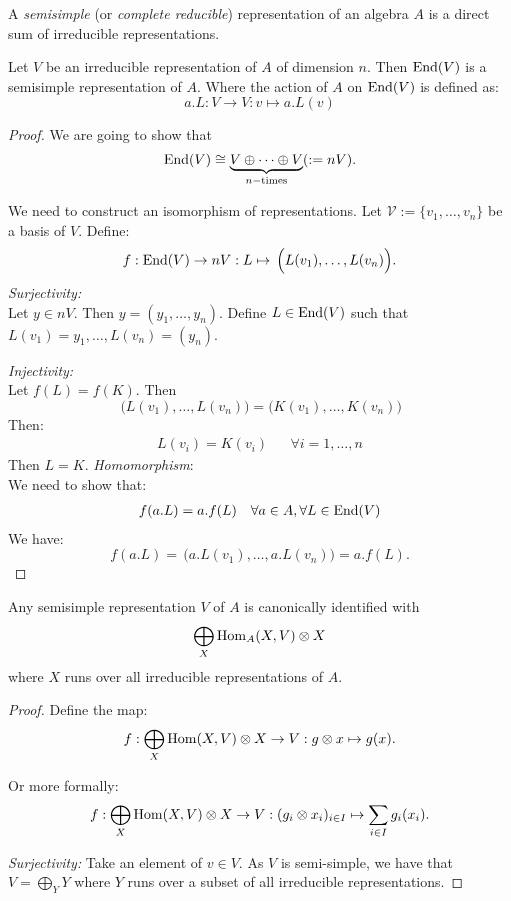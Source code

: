 \begin{defn}

A \emph{semisimple} (or \emph{complete reducible}) representation of an algebra \(A\) is a direct sum of irreducible representations.

\end{defn}

\begin{prop}

Let \(V\) be an irreducible representation of \(A\) of dimension \(n\). Then \(\operatorname{End} (V)\) is a semisimple representation of \(A\). Where the action of \(A\) on $\operatorname{End}(V)$ is defined as:
\[a.L:V\rightarrow V:v\mapsto a.L(v)\]

\end{prop}

\begin{proof}
We are going to show that
\[\operatorname{End}(V) \cong  \underbrace{V \oplus  \cdots \oplus V}_{n-\text{times}}(:=nV).\]

We need to construct an isomorphism of representations. Let \(\mathcal{V}:=\{v_{1},\ldots ,v_{n}\}\) be a basis of \(V\). Define:
\[f:\operatorname{End}(V) \rightarrow nV : L  \mapsto \, \Big(L(v_{1}),\ldots ,L(v_{n})\Big).\]
\emph{Surjectivity:} \\Let \(y\in nV\). Then \(y=(y_{1},\ldots ,y_{n})\). Define \(L\in \operatorname{End}(V)\) such that \(L(v_{1})=y_{1},\ldots ,L(v_{n})=(y_{n})\).

\emph{Injectivity:} \\Let \(f(L)=f(K)\). Then
\[\, \Big(L(v_{1}),\ldots ,L(v_{n})\Big)=\Big(K(v_{1}),\ldots ,K(v_{n})\Big)\]
Then:
\begin{align*}L(v_{i})=K(v_{i}) && \forall i=1,\ldots ,n\end{align*}
Then \(L=K\).
\newpage
\emph{Homomorphism}: \\We need to show that:
\begin{align*}f(a.L)=a.f(L) && \forall a\in A,\forall L\in \operatorname{End}(V)\end{align*}
We have:
\[f(a.L)=\, \Big(a.L(v_{1}),\ldots ,a.L(v_{n})\Big)=a.f(L).\]
\end{proof}


\begin{prop}

Any semisimple representation \(V\) of \(A\) is canonically identified with
\[\bigoplus_{X} \operatorname{Hom}_{A} (X,V) \otimes  X\]
where \(X\) runs over all irreducible representations of \(A\).
\end{prop}

\begin{proof}

Define the map:
\[f:\bigoplus_{X} \operatorname{Hom}(X,V) \otimes X \rightarrow V : g\otimes x \mapsto  g(x).\]

Or more formally:
\[f:\bigoplus_{X} \operatorname{Hom}(X,V) \otimes X \rightarrow V : (g_{i}\otimes x_{i})_{i\in I}\mapsto \sum _{i\in I}g_{i}(x_{i}).\]

\emph{Surjectivity:} Take an element of $v\in V$. As \(V\) is semi-simple, we have that \(V=\bigoplus_{Y} Y\) where \(Y\) runs over a subset of all irreducible representations.

\end{proof}

